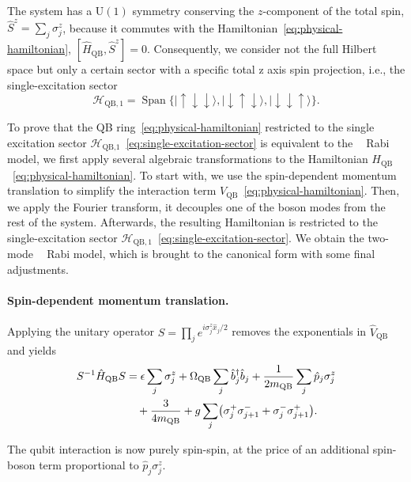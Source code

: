\documentclass[reprint, aps, prx, amsmath, amssymb, longbibliography, superscriptaddress]{revtex4-2}
\DeclareMathOperator{\Zthree}{\mathbb{Z}_3}
\begin{document}
The system has a $\mathrm{U(1)}$ symmetry conserving the $z$-component of the total  spin, $\hat S^z = \sum_j
\sigma_j^z$, because it commutes with the Hamiltonian~\eqref{eq:physical-hamiltonian}, $[ \hat H_{\text{QB}}, \hat S^z ] = 0$. Consequently, we consider not the full Hilbert space but only a certain sector with a specific total z axis spin projection, i.e., 
the single-excitation sector
\begin{equation}
\label{eq:single-excitation-sector}
  \mathcal H_{\text{QB},1} = \operatorname{Span}\bigl\{ |
    \uparrow\downarrow\downarrow\rangle,
    |\downarrow\uparrow\downarrow\rangle,
    |\downarrow\downarrow\uparrow\rangle \bigr\}.
\end{equation}

To prove that the QB ring~\eqref{eq:physical-hamiltonian} restricted to the single excitation sector $\mathcal{H}_{\text{QB,1}}$~\eqref{eq:single-excitation-sector} is equivalent to the $\Zthree$ Rabi model, we first apply several algebraic transformations to the Hamiltonian $H_{\text{QB}}$~\eqref{eq:physical-hamiltonian}. To start with, we use the spin-dependent momentum translation to simplify the interaction term $V_{\text{QB}}$~\eqref{eq:physical-hamiltonian}. Then, we apply the Fourier transform, it decouples one of the boson modes from the rest of the system. Afterwards, the resulting Hamiltonian is restricted to the single-excitation sector $\mathcal{H}_{\text{QB},1}$~\eqref{eq:single-excitation-sector}. We obtain the two-mode $\Zthree$ Rabi model, which is brought to the canonical form with some final adjustments.

\paragraph{Spin-dependent momentum translation.}
Applying the unitary operator
$S = \prod_j e^{ i \sigma_j^z \hat x_j / 2 }$ removes the exponentials in
$\hat V_{\text{QB}}$ and yields
\begin{align}
\label{eq:after-momentum-translation}
    S^{-1} \hat H_{\text{QB}} S &= \epsilon \sum_{j} \sigma_j^z
      + \Omega_{\text{QB}} \sum_j \hat b_j^{\dagger} \hat b_j
      + \frac{1}{2 m_{\text{QB}}} \sum_j \hat p_j \sigma_j^z \notag
      \\
      &\quad + \frac{3}{4 m_{\text{QB}}}
      + g \sum_{j}
        \bigl( \sigma_j^{+} \sigma_{j+1}^{-} + \sigma_j^{-} \sigma_{j+1}^{+} \bigr).
\end{align}

The qubit interaction is now purely spin-spin, at the price of an additional
spin-boson term proportional to $\hat p_j \sigma_j^z$.
\end{document}
